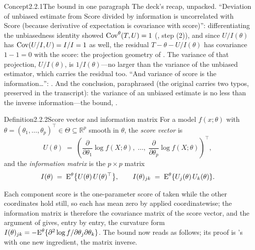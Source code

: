\documentclass[main.tex]{subfiles}
\begin{document}
\begin{ObjL}{Concept}{2.2.1}{The bound in one paragraph}
The deck's recap, unpacked. ``Deviation of unbiased estimate from Score divided by
information is uncorrelated with Score (because derivative of expectation is covariance with
score)'': differentiating the unbiasedness identity showed
$\operatorname{Cov}^{\theta}(T,U)=1$ (, step (2)), and since $U/I(\theta)$ has
$\operatorname{Cov}(U/I,U)=I/I=1$ as well, the residual $T-\theta-U/I(\theta)$ has covariance
$1-1=0$ with the score: the projection geometry of . The variance of that
projection, $U/I(\theta)$, is $1/I(\theta)$---no larger than the variance of the unbiased
estimator, which carries the residual too. ``And variance of
score is the information\dots'': . And the conclusion, paraphrased (the
original carries two typos, preserved in the transcript): the variance of an unbiased
estimate is no less than the inverse information---the bound, .
\end{ObjL}

\begin{Obj}{Definition}{2.2.2}{Score vector and information matrix}
For a model $f(x;\theta)$ with $\theta=(\theta_1,\dots,\theta_p)^{\top}\in\Theta\subseteq
\mathbb{R}^p$ smooth in $\theta$, the \emph{score vector} is
\[ U(\theta) \;=\; \left( \frac{\partial}{\partial\theta_1}\log f(X;\theta),\;
   \dots,\; \frac{\partial}{\partial\theta_p}\log f(X;\theta) \right)^{\!\top} , \]
and the \emph{information matrix} is the $p\times p$ matrix
\[ I(\theta) \;=\; \mathrm{E}^{\theta}\big\{ U(\theta)\,U(\theta)^{\top} \big\} , \qquad
   I(\theta)_{jk} \;=\; \mathrm{E}^{\theta}\{ U_j(\theta)\,U_k(\theta) \} . \]
\end{Obj}

\medskip
Each component score is the one-parameter score of  taken while the other
coordinates hold still, so each has mean zero by  applied coordinatewise; the
information matrix is therefore the covariance matrix of the score vector, and the argument
of  gives, entry by entry, the curvature form
$I(\theta)_{jk}=-\mathrm{E}^{\theta}\{\partial^2 \log f/\partial\theta_j\partial\theta_k\}$. The
bound now reads as follows; its proof is 's with one new ingredient, the
matrix inverse.
\end{document}
